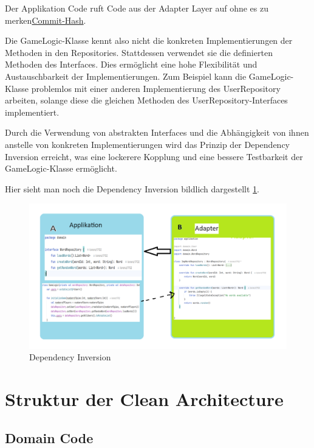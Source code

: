

Der Applikation Code ruft Code aus der Adapter Layer auf ohne es zu merken\href{https://github.com/lorenz1702/Spy-Game/commit/280bfad83aeff3a2e16b78514f29b766b8f8259f}{Commit-Hash}. 

Die GameLogic-Klasse kennt also nicht die konkreten Implementierungen der Methoden in den Repositories. Stattdessen verwendet sie die definierten Methoden des Interfaces. Dies ermöglicht eine hohe Flexibilität und Austauschbarkeit der Implementierungen. Zum Beispiel kann die GameLogic-Klasse problemlos mit einer anderen Implementierung des UserRepository arbeiten, solange diese die gleichen Methoden des UserRepository-Interfaces implementiert.
    
Durch die Verwendung von abstrakten Interfaces und die Abhängigkeit von ihnen anstelle von konkreten Implementierungen wird das Prinzip der Dependency Inversion erreicht, was eine lockerere Kopplung und eine bessere Testbarkeit der GameLogic-Klasse ermöglicht.

Hier sieht man noch die Dependency Inversion bildlich dargestellt \ref{fig:14}.

\begin{figure}[h]
    \centering
    \includegraphics[width=17cm]{images/Denpendancy Inversion.png}
    \caption{Dependency Inversion}%
    \label{fig:14}
\end{figure}

\section{Struktur der Clean Architecture}

\subsection{Domain Code}

